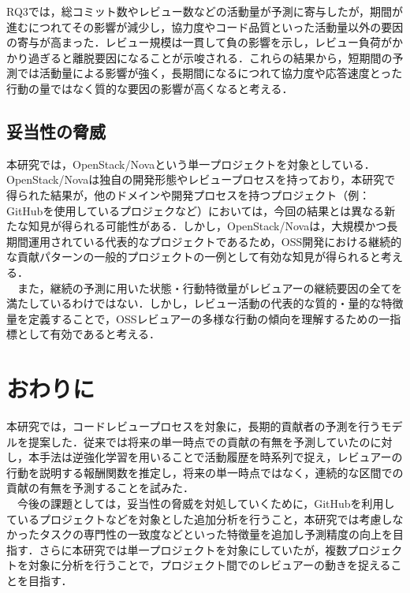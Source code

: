 \documentclass[submit,techrep,noauthor]{ipsj}
\begin{document}
RQ3では，総コミット数やレビュー数などの活動量が予測に寄与したが，期間が進むにつれてその影響が減少し，協力度やコード品質といった活動量以外の要因の寄与が高まった．レビュー規模は一貫して負の影響を示し，レビュー負荷がかかり過ぎると離脱要因になることが示唆される．これらの結果から，短期間の予測では活動量による影響が強く，長期間になるにつれて協力度や応答速度とった行動の量ではなく質的な要因の影響が高くなると考える．

\subsection{妥当性の脅威}
本研究では，OpenStack/Novaという単一プロジェクトを対象としている．OpenStack/Novaは独自の開発形態やレビュープロセスを持っており，本研究で得られた結果が，他のドメインや開発プロセスを持つプロジェクト（例：GitHubを使用しているプロジェクなど）においては，今回の結果とは異なる新たな知見が得られる可能性がある．しかし，OpenStack/Novaは，大規模かつ長期間運用されている代表的なプロジェクトであるため，OSS開発における継続的な貢献パターンの一般的プロジェクトの一例として有効な知見が得られると考える．\\
　また，継続の予測に用いた状態・行動特徴量がレビュアーの継続要因の全てを満たしているわけではない．しかし，レビュー活動の代表的な質的・量的な特徴量を定義することで，OSSレビュアーの多様な行動の傾向を理解するための一指標として有効であると考える．

\section{おわりに}
\label{sec:conclusion}
本研究では，コードレビュープロセスを対象に，長期的貢献者の予測を行うモデルを提案した．従来では将来の単一時点での貢献の有無を予測していたのに対し，本手法は逆強化学習を用いることで活動履歴を時系列で捉え，レビュアーの行動を説明する報酬関数を推定し，将来の単一時点ではなく，連続的な区間での貢献の有無を予測することを試みた．\\
　今後の課題としては，妥当性の脅威を対処していくために，GitHubを利用しているプロジェクトなどを対象とした追加分析を行うこと，本研究では考慮しなかったタスクの専門性の一致度などといった特徴量を追加し予測精度の向上を目指す．さらに本研究では単一プロジェクトを対象にしていたが，複数プロジェクトを対象に分析を行うことで，プロジェクト間でのレビュアーの動きを捉えることを目指す．




\end{document}

